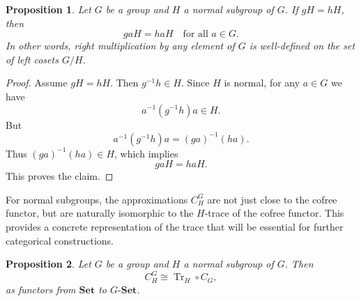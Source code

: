 \documentclass{amsart}
\newtheorem{proposition}{Proposition}
\begin{document}
\begin{proposition}\label{prop:normal_right_action}
Let $G$ be a group and $H$ a normal subgroup of $G$. If $gH = hH$, then
\[
gaH = haH \quad \text{for all } a \in G.
\]
In other words, right multiplication by any element of $G$ is well-defined on the set of left cosets $G/H$.
\end{proposition}

\begin{proof}
Assume $gH = hH$. Then $g^{-1}h \in H$. Since $H$ is normal, for any $a \in G$ we have
\[
a^{-1}(g^{-1}h)a \in H.
\]
But
\[
a^{-1}(g^{-1}h)a = (ga)^{-1}(ha).
\]
Thus $(ga)^{-1}(ha) \in H$, which implies
\[
gaH = haH.
\]
This proves the claim.
\end{proof}

For normal subgroups, the approximations $C_H^G$ are not just close to the cofree functor, but are naturally isomorphic to the $H$-trace of the cofree functor. This provides a concrete representation of the trace that will be essential for further categorical constructions.

\begin{proposition}\label{prop:CHG_iso}
Let $G$ be a group and $H$ a normal subgroup of $G$. Then
\[
C_H^G \cong \operatorname{Tr}_H \circ C_G,
\]
as functors from $\mathbf{Set}$ to $G\text{-}\mathbf{Set}$.
\end{proposition}
\end{document}
